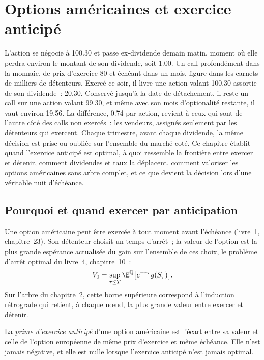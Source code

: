 \chapter{Options américaines et exercice anticipé}\label{ch:dv:american-options-and-early-exercise}

L'action se négocie à 100.30 et passe ex-dividende demain matin, moment où elle
perdra environ le montant de son dividende, soit 1.00. Un call profondément dans la
monnaie, de prix d'exercice 80 et échéant dans un mois, figure dans les carnets de milliers
de détenteurs. Exercé ce soir, il livre une action valant 100.30 assortie de son dividende~: 20.30.
Conservé jusqu'à la date de détachement, il reste un call sur une action valant 99.30, et même avec
son mois d'optionalité restante, il vaut environ 19.56. La différence, 0.74
par action, revient à ceux qui sont de l'autre côté des calls
non exercés~: les vendeurs, assignés seulement par les détenteurs qui exercent.
Chaque trimestre, avant chaque dividende, la même décision est prise ou oubliée
sur l'ensemble du marché coté. Ce chapitre établit quand l'exercice anticipé est optimal,
à quoi ressemble la frontière entre exercer et détenir, comment dividendes et taux la déplacent,
comment valoriser les options américaines sans arbre complet, et ce que devient la décision
lors d'une véritable nuit d'échéance.

\section{Pourquoi et quand exercer par anticipation}

Une option américaine peut être exercée à tout moment avant l'échéance (livre~1,
chapitre~23). Son détenteur choisit un temps d'arrêt~; la valeur de l'option est la
plus grande espérance actualisée du gain sur l'ensemble de ces choix, le problème d'arrêt
optimal du livre~4, chapitre~10~:
\[
V_0=\sup_{\tau\le T}\E^{\mathbb Q}\bigl[e^{-r\tau}g(S_\tau)\bigr].
\]
Sur l'arbre du chapitre~2, cette borne supérieure correspond à l'induction rétrograde qui retient, à
chaque nœud, la plus grande valeur entre exercer et détenir.

\begin{definition}\label{def:dv:american-options-and-early-exercise:premium}
La \emph{prime d'exercice anticipé} d'une option américaine
est l'écart entre sa valeur et celle de l'option européenne de même
prix d'exercice et même échéance. Elle n'est jamais négative, et elle est nulle lorsque
l'exercice anticipé n'est jamais optimal.
\end{definition}

